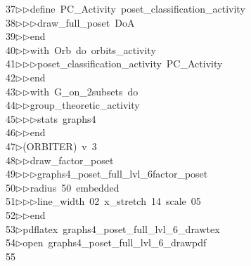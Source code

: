 \begin{tabbing}
37\>$\triangleright$\>$\triangleright$\>define\ PC\_Activity\ poset\_classification\_activity\ \\[0pt]
38\>$\triangleright$\>$\triangleright$\>$\triangleright$\>draw\_full\_poset\ DoA\ \\[0pt]
39\>$\triangleright$\>$\triangleright$\>end\ \\[0pt]
40\>$\triangleright$\>$\triangleright$\>with\ Orb\ do\ orbits\_activity\ \\[0pt]
41\>$\triangleright$\>$\triangleright$\>$\triangleright$\>poset\_classification\_activity\ PC\_Activity\ \\[0pt]
42\>$\triangleright$\>$\triangleright$\>end\ \\[0pt]
43\>$\triangleright$\>$\triangleright$\>with\ G\_on\_2subsets\ do\ \\[0pt]
44\>$\triangleright$\>$\triangleright$\>group\_theoretic\_activity\ \\[0pt]
45\>$\triangleright$\>$\triangleright$\>$\triangleright$\>stats\ graphs4\ \\[0pt]
46\>$\triangleright$\>$\triangleright$\>end\\[0pt]
47\>$\triangleright$\>(ORBITER)\ v\ 3\ \\[0pt]
48\>$\triangleright$\>$\triangleright$\>draw\_factor\_poset\ \\[0pt]
49\>$\triangleright$\>$\triangleright$\>$\triangleright$\>graphs4\_poset\_full\_lvl\_6factor\_poset\ \\[0pt]
50\>$\triangleright$\>$\triangleright$\>radius\ 50\ embedded\ \\[0pt]
51\>$\triangleright$\>$\triangleright$\>$\triangleright$\>line\_width\ 02\ x\_stretch\ 14\ scale\ 05\ \\[0pt]
52\>$\triangleright$\>$\triangleright$\>end\\[0pt]
53\>$\triangleright$\>pdflatex\ graphs4\_poset\_full\_lvl\_6\_drawtex\\[0pt]
54\>$\triangleright$\>open\ graphs4\_poset\_full\_lvl\_6\_drawpdf\\[0pt]
55\>\end{tabbing}
